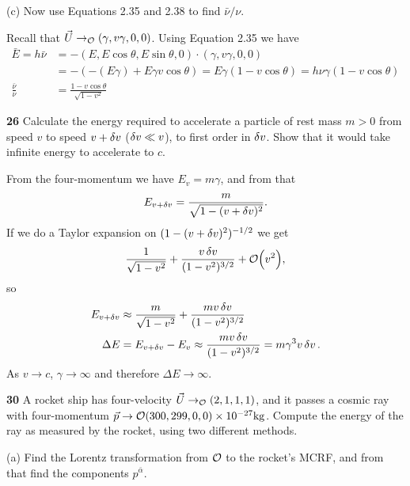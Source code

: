 \documentclass[gr-notes.tex]{subfiles}
\begin{document}
(c) Now use Equations 2.35 and 2.38 to find $\bar\nu / \nu$.

Recall that $\vec{U} \to_\obs (\gamma, v \gamma, 0, 0)$. Using Equation 2.35 we have
%
\begin{align*}
  \bar{E} =
  h \bar\nu &=
  -(E, E \cos\theta, E \sin\theta, 0) \cdot (\gamma, v \gamma, 0, 0)
  \\ &=
  -(-(E \gamma) + E \gamma v \cos\theta) =
  E \gamma (1 - v \cos \theta) =
  h \nu \gamma (1 - v \cos \theta)
  \\
  \frac{\bar\nu}{\nu} &=
  \frac{1 - v \cos\theta}{\sqrt{1 - v^2}}
\end{align*}





\textbf{26}
Calculate the energy required to accelerate a particle of rest mass $m > 0$ from speed $v$ to speed $v + \var{v}$ ($\var{v} \ll v$), to first order in $\var{v}$. Show that it would take infinite energy to accelerate to $c$.

From the four-momentum we have $E_v = m \gamma$, and from that
%
\begin{displaymath}
  E_{v + \var{v}} = \frac{m}{\sqrt{1 - (v + \var{v})^2}}.
\end{displaymath}
%
If we do a Taylor expansion on $(1 - (v + \var{v})^2)^{-1/2}$ we get
%
\begin{displaymath}
  \frac{1}{\sqrt{1 - v^2}} +
  \frac{v \var{v}}{(1 - v^2)^{3/2}} +
  \order{v^2},
\end{displaymath}
%
so
\begin{align*}
  E_{v + \var{v}} &\approx
  \frac{m}{\sqrt{1 - v^2}} +
  \frac{m v \var{v}}{(1 - v^2)^{3/2}}
  \\
  \Delta E &=
  E_{v + \var{v}} - E_v \approx
  \frac{m v \var{v}}{(1 - v^2)^{3/2}} =
  m \gamma^3 v \var{v}.
\end{align*}
%
As $v \to c$, $\gamma \to \infty$ and therefore $\Delta E \to \infty$.



\textbf{30}
A rocket ship has four-velocity $\vec{U} \to_\obs (2, 1, 1, 1)$, and it passes a cosmic ray with four-momentum $\vec{p} \to\obs (300, 299, 0, 0) \times 10^{-27} \si{kg}$. Compute the energy of the ray as measured by the rocket, using two different methods.

(a) Find the Lorentz transformation from $\obs$ to the rocket's MCRF, and from that find the components $p^{\bar\alpha}$.
\end{document}
